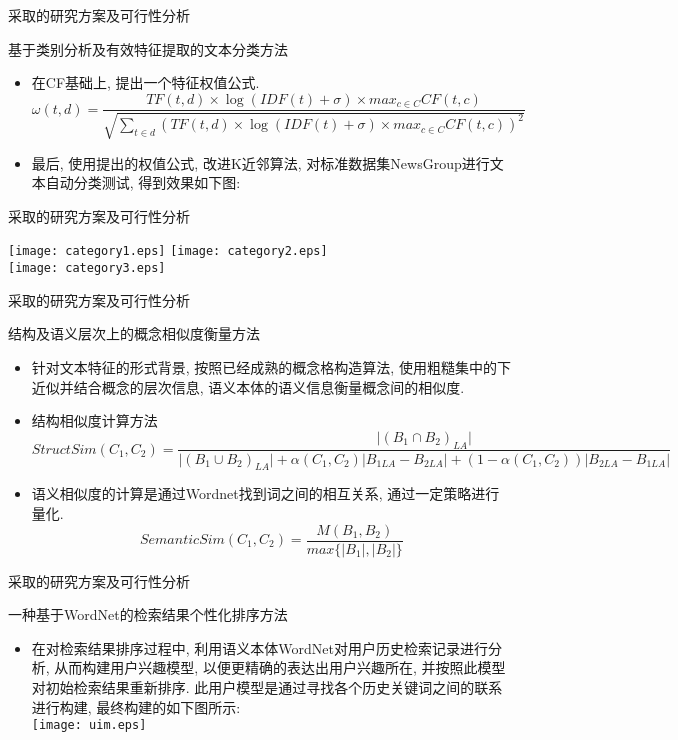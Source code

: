 \documentclass[dvipdfm]{beamer}
\begin{document}
\begin{frame}[t]{采取的研究方案及可行性分析}
  \begin{block}{基于类别分析及有效特征提取的文本分类方法}
    \begin{itemize}
    \item 在CF基础上, 提出一个特征权值公式. \small{$$ \omega(t,d)=\frac{TF(t,d)\times\log(IDF(t)+\sigma)\times max_{c \in C}CF(t,c)}{\sqrt{\sum_{t \in d}(TF(t,d)\times\log(IDF(t)+\sigma)\times max_{c \in C}CF(t,c))^2}}$$ } \pause
    \item 最后, 使用提出的权值公式, 改进K近邻算法, 对标准数据集NewsGroup进行文本自动分类测试, 得到效果如下图:
    \end{itemize}
  \end{block}
\end{frame}

\begin{frame}[t]{采取的研究方案及可行性分析}

    \centering \texttt{[image: category1.eps]}
    \centering \texttt{[image: category2.eps]} \\
    \centering \texttt{[image: category3.eps]}

\end{frame}

\begin{frame}[t]{采取的研究方案及可行性分析}
  \begin{block}{结构及语义层次上的概念相似度衡量方法}
    \begin{itemize}
    \item 针对文本特征的形式背景, 按照已经成熟的概念格构造算法, 使用粗糙集中的下近似并结合概念的层次信息, 语义本体的语义信息衡量概念间的相似度.\pause
    \item 结构相似度计算方法 \tiny{$$ StructSim(C_1,C_2)=\frac{\lvert (B_1 \cap B_2)_{LA} \rvert}{\lvert (B_1 \cup B_2)_{LA} \rvert+\alpha(C_1, C_2)\lvert B_{1LA} - B_{2LA} \rvert+(1-\alpha(C_1, C_2))\lvert B_{2LA} - B_{1LA} \rvert} $$ }\pause
    \item \small{语义相似度的计算是通过Wordnet找到词之间的相互关系, 通过一定策略进行量化. $$ SemanticSim(C_1,C_2)=\frac{M(B_1, B_2)}{max\{\lvert B_1\rvert, \lvert B_2\rvert\}}$$ }
    \end{itemize}
  \end{block}
\end{frame}

\begin{frame}[t]{采取的研究方案及可行性分析}
  \begin{block}{一种基于WordNet的检索结果个性化排序方法}
    \begin{itemize}
    \item 在对检索结果排序过程中, 利用\alert{语义本体WordNet}对用户历史检索记录进行分析, 从而构建用户兴趣模型, 以便更精确的表达出用户兴趣所在, 并按照此模型对初始检索结果重新排序. 此用户模型是通过寻找各个历史关键词之间的联系进行构建, 最终构建的如下图所示:  \\
    \centering \texttt{[image: uim.eps]}
    \end{itemize}
  \end{block}
\end{frame}
\end{document}
